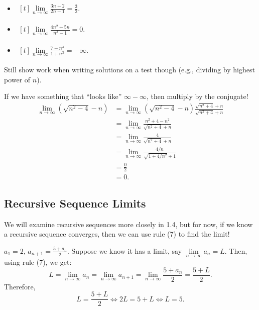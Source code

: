 \begin{Example}{}{}
    \begin{itemize}
        \item $ \begin{aligned}[t]
                      \lim\limits_{{n} \to {\infty}}\frac{3n+2}{2n-1}=\frac{3}{2}.
                  \end{aligned} $
        \item $ \begin{aligned}[t]
                      \lim\limits_{{n} \to {\infty}}\frac{4n^2+5n}{n^3-1}=0.
                  \end{aligned} $
        \item $ \begin{aligned}[t]
                      \lim\limits_{{n} \to {\infty}}\frac{7-n^4}{1+n^3}=-\infty.
                  \end{aligned} $
    \end{itemize}
\end{Example}
\begin{Remark}{}{}
    Still show work when writing solutions on a test though (e.g.,
    dividing by highest power of $ n $).
\end{Remark}
\begin{Example}{}{}
    If we have something that ``looks like'' $ \infty-\infty $,
    then multiply by the conjugate!
    \begin{align*}
        \lim\limits_{{n} \to {\infty}}(\sqrt{n^2-4}-n)
         & =\lim\limits_{{n} \to {\infty}}(\sqrt{n^2-4}-n) \frac{\sqrt{n^2+4}+n}{\sqrt{n^2+4}+n} \\
         & =\lim\limits_{{n} \to {\infty}}\frac{n^2+4-n^2}{\sqrt{n^2+4}+n}                       \\
         & =\lim\limits_{{n} \to {\infty}}\frac{4}{\sqrt{n^2+4}+n}                               \\
         & =\lim\limits_{{n} \to {\infty}}\frac{4/n}{\sqrt{1+4/n^2}+1}                           \\
         & =\frac{0}{2}                                                                          \\
         & =0.
    \end{align*}
\end{Example}
\subsection*{Recursive Sequence Limits}
We will examine recursive sequences more closely in 1.4,
but for now, if we know a recursive sequence converges,
then we can use rule (7) to find the limit!
\begin{Example}{}{}
    $ a_1=2 $, $ a_{n+1}=\frac{5+a_n}{2} $.
    Suppose we know it has a limit, say $ \lim\limits_{{n} \to {\infty}}a_n=L $.
    Then, using rule (7), we get:
    \[ L=\lim\limits_{{n} \to {\infty}}a_n=
        \lim\limits_{{n} \to {\infty}}a_{n+1}=
        \lim\limits_{{n} \to {\infty}}\frac{5+a_n}{2}=
        \frac{5+L}{2}. \]
    Therefore,
    \[ L=\frac{5+L}{2}\iff 2L=5+L\iff L=5. \]
\end{Example}
